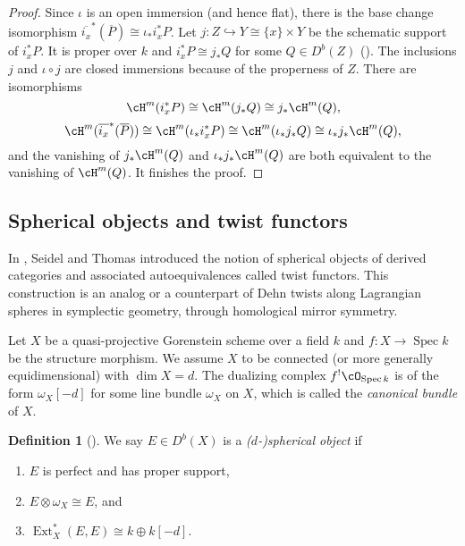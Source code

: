 \documentclass{amsart}
\numberwithin{equation}{section}
\theoremstyle{plain}
\theoremstyle{definition}
\newtheorem{definition}[theorem]{Definition}
\DeclareMathOperator{\Spec}{\mathrm{Spec}}
\DeclareMathOperator{\Ext}{\mathrm{Ext}}
\begin{document}
\begin{proof}
    Since $\iota$ is an open immersion (and hence flat), there is the base change isomorphism $\overline{i_x}^*(\overline{P}) \cong \iota_*i_x^*P$.
    Let $j \colon Z \hookrightarrow Y \cong \{x\} \times Y$ be the schematic support of $i_x^*P$.
    It is proper over $k$ and $i_x^*P \cong j_*Q$ for some $Q \in D^b(Z)$ (\cite[\href{https://stacks.math.columbia.edu/tag/0CYK}{Tag 0CYK}]{stacks-project}).
    The inclusions $j$ and $\iota \circ j$ are closed immersions because of the properness of $Z$.
    There are isomorphisms
    \begin{equation}
        \cH^m(i_x^*P) \cong \cH^m(j_*Q) \cong j_*\cH^m(Q),
    \end{equation}
    \begin{equation}
        \cH^m(\overline{i_x}^*(\overline{P})) \cong \cH^m(\iota_*i_x^*P) \cong \cH^m(\iota_*j_*Q) \cong \iota_*j_*\cH^m(Q),
    \end{equation}
    and the vanishing of $j_*\cH^m(Q)$ and $\iota_*j_*\cH^m(Q)$ are both equivalent to the vanishing of $\cH^m(Q)$.
    It finishes the proof.
\end{proof}


\subsection{Spherical objects and twist functors}
In \cite{MR1831820}, Seidel and Thomas introduced the notion of spherical objects of derived categories and associated autoequivalences called twist functors.
This construction is an analog or a counterpart of Dehn twists along Lagrangian spheres in symplectic geometry, through homological mirror symmetry.

Let $X$ be a quasi-projective Gorenstein scheme over a field $k$ and $f \colon X \to \Spec k$ be the structure morphism.
We assume $X$ to be connected (or more generally equidimensional) with $\dim X = d$.
The dualizing complex $f^!\cO_{\Spec k}$ is of the form $\omega_X[-d]$ for some line bundle $\omega_X$ on $X$, which is called the \emph{canonical bundle} of $X$.
\begin{definition}[{\cite{MR1831820}}]
    We say $E \in D^b(X)$ is a \emph{($d$-)spherical object} if
    \begin{enumerate}
        \item $E$ is perfect and has proper support,
        \item $E \otimes \omega_X \cong E$, and
        \item $\Ext^*_X(E, E) \cong k \oplus k[-d]$.
    \end{enumerate}
\end{definition}
\end{document}
